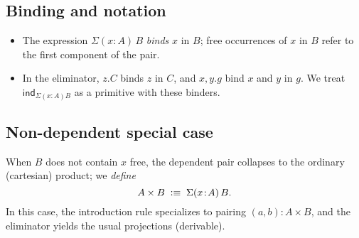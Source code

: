 \documentclass{article}
\newcommand{\Type}{\ensuremath{\mathsf{Type}}}
\newcommand{\defeq}{\vcentcolon\equiv}
\begin{document}
\subsection*{Binding and notation}

\begin{itemize}
  \item The expression \(\Sigma(x\!:\!A)\,B\) \emph{binds} \(x\) in \(B\); free occurrences
        of \(x\) in \(B\) refer to the first component of the pair.
  \item In the eliminator, \(z.C\) binds \(z\) in \(C\), and \(x,y.g\) bind \(x\) and \(y\) in \(g\).
        We treat \(\mathsf{ind}_{\Sigma(x\!:\!A)B}\) as a primitive with these binders.
\end{itemize}

\subsection*{Non-dependent special case}

When \(B\) does not contain \(x\) free, the dependent pair collapses to the ordinary
(cartesian) product; we \emph{define}
\[
A \times B \;\defeq\; \Sigma(x\!:\!A)\,B.
\]
In this case, the introduction rule specializes to pairing \((a,b):A\times B\),
and the eliminator yields the usual projections (derivable).


\end{document}
